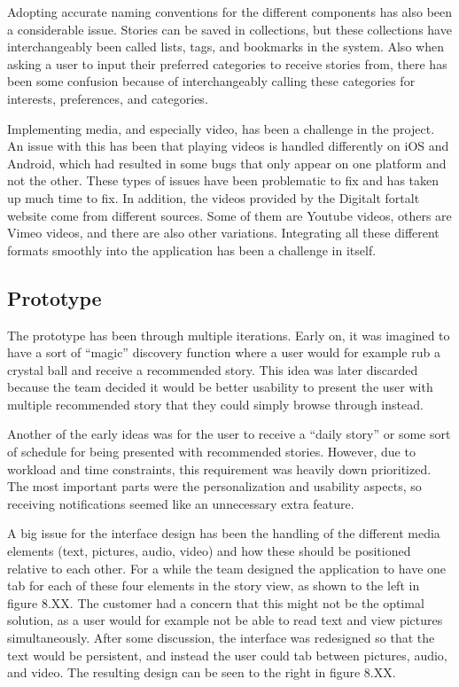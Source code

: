 Adopting accurate naming conventions for the different components has also been a considerable issue. Stories can be saved in collections, but these collections have interchangeably been called lists, tags, and bookmarks in the system. Also when asking a user to input their preferred categories to receive stories from, there has been some confusion because of interchangeably calling these categories for interests,  preferences, and categories.\newline

Implementing media, and especially video, has been a challenge in the project. An issue with this has been that playing videos is handled differently on iOS and Android, which had resulted in some bugs that only appear on one platform and not the other. These types of issues have been problematic to fix and has taken up much time to fix. In addition, the videos provided by the Digitalt fortalt website come from different sources. Some of them are Youtube videos, others are Vimeo videos, and there are also other variations. Integrating all these different formats smoothly into the application has been a challenge in itself.

\subsection{Prototype}

The prototype has been through multiple iterations. Early on, it was imagined to have a sort of “magic” discovery function where a user would for example rub a crystal ball and receive a recommended story. This idea was later discarded because the team decided it would be better usability to present the user with multiple recommended story that they could simply browse through instead.\newline

Another of the early ideas was for the user to receive a “daily story” or some sort of schedule for being presented with recommended stories. However, due to workload and time constraints, this requirement was heavily down prioritized. The most important parts were the personalization and usability aspects, so receiving notifications seemed like an unnecessary extra feature.\newline

A big issue for the interface design has been the handling of the different media elements (text, pictures, audio, video) and how these should be positioned relative to each other. For a while the team designed the application to have one tab for each of these four elements in the story view, as shown to the left in figure 8.XX. The customer had a concern that this might not be the optimal solution, as a user would for example not be able to read text and view pictures simultaneously. After some discussion, the interface was redesigned so that the text would be persistent, and instead the user could tab between pictures, audio, and video. The resulting design can be seen to the right in figure 8.XX. 

